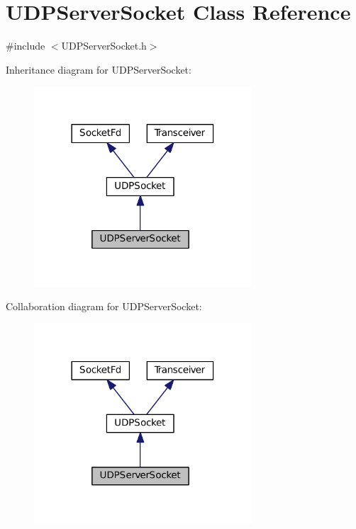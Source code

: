 \hypertarget{classUDPServerSocket}{\section{U\+D\+P\+Server\+Socket Class Reference}
\label{classUDPServerSocket}
}


{\ttfamily \#include $<$U\+D\+P\+Server\+Socket.\+h$>$}



Inheritance diagram for U\+D\+P\+Server\+Socket\+:
\nopagebreak
\begin{figure}[H]
\begin{center}
\leavevmode
\includegraphics[width=230pt]{classUDPServerSocket__inherit__graph}
\end{center}
\end{figure}


Collaboration diagram for U\+D\+P\+Server\+Socket\+:
\nopagebreak
\begin{figure}[H]
\begin{center}
\leavevmode
\includegraphics[width=230pt]{classUDPServerSocket__coll__graph}
\end{center}
\end{figure}
